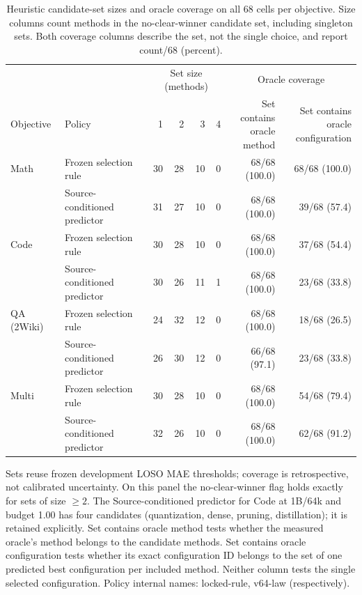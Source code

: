 \begin{table}[H]
\centering\small
\setlength{\tabcolsep}{3pt}
\caption{Heuristic candidate-set sizes and oracle coverage on all 68 cells per objective. Size columns count methods in the no-clear-winner candidate set, including singleton sets. Both coverage columns describe the set, not the single choice, and report count/68 (percent).}
\label{tab:rule-confirm-candidate-sizes}
\begin{tabularx}{\linewidth}{lXrrrrrr}
\toprule
& & \multicolumn{4}{c}{Set size (methods)} & \multicolumn{2}{c}{Oracle coverage} \\
\cmidrule(lr){3-6}\cmidrule(lr){7-8}
Objective & Policy & 1 & 2 & 3 & 4 & \shortstack{Set contains\\oracle method} & \shortstack{Set contains\\oracle configuration} \\
\midrule
Math & Frozen selection rule & 30 & 28 & 10 & 0 & 68/68 (100.0) & 68/68 (100.0) \\
 & Source-conditioned predictor & 31 & 27 & 10 & 0 & 68/68 (100.0) & 39/68 (57.4) \\
\midrule
Code & Frozen selection rule & 30 & 28 & 10 & 0 & 68/68 (100.0) & 37/68 (54.4) \\
 & Source-conditioned predictor & 30 & 26 & 11 & 1 & 68/68 (100.0) & 23/68 (33.8) \\
\midrule
QA (2Wiki) & Frozen selection rule & 24 & 32 & 12 & 0 & 68/68 (100.0) & 18/68 (26.5) \\
 & Source-conditioned predictor & 26 & 30 & 12 & 0 & 66/68 (97.1) & 23/68 (33.8) \\
\midrule
Multi & Frozen selection rule & 30 & 28 & 10 & 0 & 68/68 (100.0) & 54/68 (79.4) \\
 & Source-conditioned predictor & 32 & 26 & 10 & 0 & 68/68 (100.0) & 62/68 (91.2) \\
\bottomrule
\end{tabularx}
\par\smallskip\begin{minipage}{\linewidth}\footnotesize
Sets reuse frozen development LOSO MAE thresholds; coverage is retrospective, not calibrated uncertainty. On this panel the no-clear-winner flag holds exactly for sets of size $\geq2$. The Source-conditioned predictor for Code at 1B/64k and budget 1.00 has four candidates (quantization, dense, pruning, distillation); it is retained explicitly. Set contains oracle method tests whether the measured oracle's method belongs to the candidate methods. Set contains oracle configuration tests whether its exact configuration ID belongs to the set of one predicted best configuration per included method. Neither column tests the single selected configuration. Policy internal names: locked-rule, v64-law (respectively).
\end{minipage}
\end{table}

